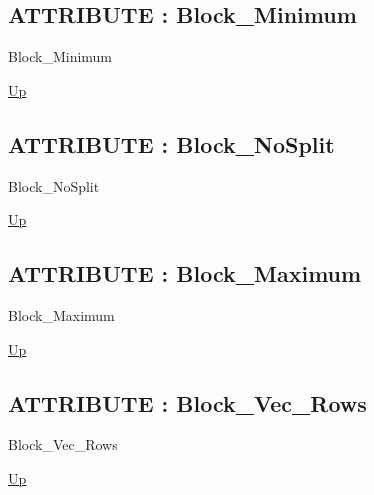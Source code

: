 \subsection*{ATTRIBUTE : Block\_Minimum}
\hypertarget{ecldoc:pbblas.constants.block_minimum}{}
\begin{minipage}[t]{\textwidth}
\begin{flushleft}
 Block\_Minimum 
\end{flushleft}
\end{minipage}
\hyperlink{ecldoc:PBblas.Constants}{Up}

\par
\par
\subsection*{ATTRIBUTE : Block\_NoSplit}
\hypertarget{ecldoc:pbblas.constants.block_nosplit}{}
\begin{minipage}[t]{\textwidth}
\begin{flushleft}
 Block\_NoSplit 
\end{flushleft}
\end{minipage}
\hyperlink{ecldoc:PBblas.Constants}{Up}

\par
\par
\subsection*{ATTRIBUTE : Block\_Maximum}
\hypertarget{ecldoc:pbblas.constants.block_maximum}{}
\begin{minipage}[t]{\textwidth}
\begin{flushleft}
 Block\_Maximum 
\end{flushleft}
\end{minipage}
\hyperlink{ecldoc:PBblas.Constants}{Up}

\par
\par
\subsection*{ATTRIBUTE : Block\_Vec\_Rows}
\hypertarget{ecldoc:pbblas.constants.block_vec_rows}{}
\begin{minipage}[t]{\textwidth}
\begin{flushleft}
 Block\_Vec\_Rows 
\end{flushleft}
\end{minipage}
\hyperlink{ecldoc:PBblas.Constants}{Up}

